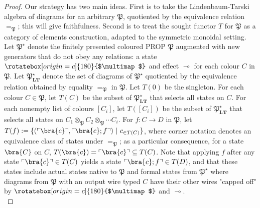\begin{fullwidth}
\begin{theorem}
\begin{proof}
Our strategy has two main ideas. First is to take the Lindenbaum-Tarski algebra of diagrams for an arbitrary $\mathfrak{P}$, quotiented by the equivalence relation $=_\mathfrak{P}$; this will give faithfulness. Second is to treat the sought functor $T$ for $\mathfrak{P}$ as a category of elements construction, adapted to the symmetric monoidal setting. Let $\mathfrak{P}^\star$ denote the finitely presented coloured PROP $\mathfrak{P}$ augmented with new generators that do not obey any relations: a state $\rotatebox[origin=c]{180}{$\multimap$}$ and effect $\multimap$ for each colour $C$ in $\mathfrak{P}$. Let $\mathfrak{P}^\star_{\mathbf{LT}}$ denote the set of diagrams of $\mathfrak{P}^\star$ quotiented by the equivalence relation obtained by equality $=_\mathfrak{P}$ in $\mathfrak{P}$. Let $T(0)$ be the singleton. For each colour $C \in \mathfrak{P}$, let $T(C)$ be the subset of $\mathfrak{P}^\star_{\mathbf{LT}}$ that selects all states on $C$. For each nonempty list of colours $[C_i]$, let $T([C_i])$ be the subset of $\mathfrak{P}^\star_{\mathbf{LT}}$ that selects all states on $C_1 \otimes_\mathfrak{P} C_2 \otimes_\mathfrak{P} \cdots C_i$. For $f: C \rightarrow D$ in $\mathfrak{P}$, let $T(f) := \{(\ulcorner \bra{c} \urcorner, \ulcorner \bra{c};f \urcorner) \ | \ c_{\in T(C)}\}$, where corner notation denotes an equivalence class of states under $=_\mathfrak{P}$; as a particular consequence, for a state $\bra{C}$ on $C$, $T(\bra{c}) = \ulcorner \bra{c} \urcorner \subseteq T(C)$. Note that applying $f$ after any state $\ulcorner \bra{c} \urcorner \in T(C)$ yields a state $\ulcorner \bra{c} ; f \urcorner \in T(D)$, and that these states include actual states native to $\mathfrak{P}$ and formal states from $\mathfrak{P}^\star$ where diagrams from $\mathfrak{P}$ with an output wire typed $C$ have their other wires "capped off" by $\rotatebox[origin=c]{180}{$\multimap$}$ and $\multimap$.\\


\end{proof}
\end{theorem}
\end{fullwidth}
